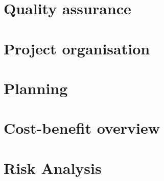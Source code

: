 \documentclass[11pt, a4paper]{report}
\begin{document}
\begin{justify}
\chapter{Quality assurance}
	

\chapter{Project organisation}
	

\chapter{Planning}
	

\chapter{Cost-benefit overview}
	

\chapter{Risk Analysis}
	

	\end{justify}
\end{document}
